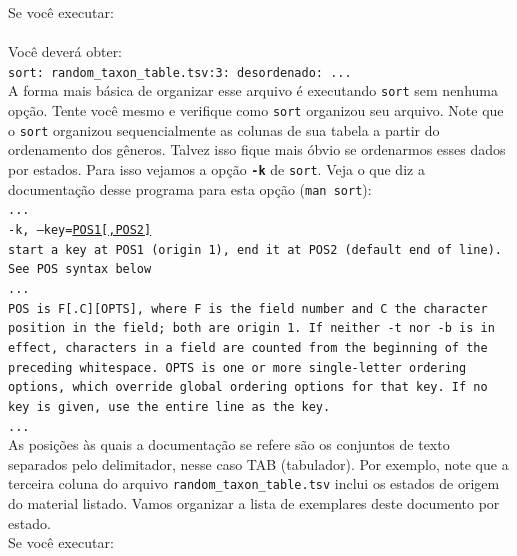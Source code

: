\begin{refsection}
Se você executar:\\
\\

Você deverá obter:\\
\texttt{sort: random\_taxon\_table.tsv:3: desordenado: ...}\\

A forma mais básica de organizar esse arquivo é executando \texttt{sort} sem nenhuma opção. Tente você mesmo e verifique como \texttt{sort} organizou seu arquivo. Note que o \texttt{sort} organizou sequencialmente as colunas de sua tabela a partir do ordenamento dos gêneros. Talvez isso fique mais óbvio se ordenarmos esses dados por estados. Para isso vejamos a opção \texttt{\textbf{-k}} de \texttt{sort}. Veja o que diz a documentação desse programa para esta opção (\texttt{man sort}):\\

\noindent\texttt{...}\\
\texttt{-k, --key=\underline{POS1[,POS2]}}\\
\indent\texttt{start a key at POS1 (origin 1), end it at POS2 (default end of line).  See POS syntax below}\\
\texttt{...}\\
\texttt{POS  is  F[.C][OPTS],  where  F  is the field number and C the character position in the field; both are origin 1.  If neither -t nor -b is in effect, characters in a field are counted from the beginning of the preceding whitespace.  OPTS is one or more single-letter ordering options, which override global ordering options for that key.  If no key is given, use the entire line as the key.}\\
\texttt{...}\\

As posições às quais a documentação se refere são os conjuntos de texto separados pelo delimitador, nesse caso \textsc{TAB} (tabulador). Por exemplo, note que a terceira coluna do arquivo \texttt{random\_taxon\_table.tsv} inclui os estados de origem do material listado. Vamos organizar a lista de exemplares deste documento por estado.\\

Se você executar:\\
\\


\end{refsection}
